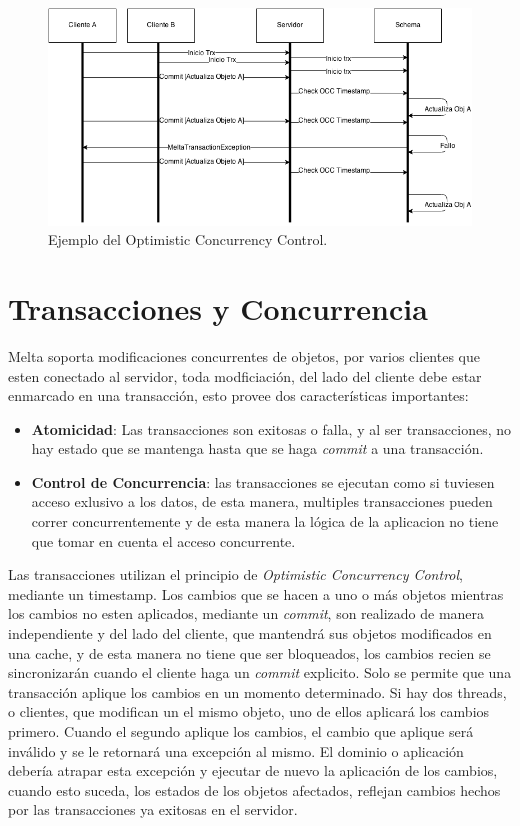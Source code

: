\documentclass{melta}
\begin{document}
\begin{figure}
\centering
\includegraphics[scale=0.5]{Transaccion}
\caption{Ejemplo del Optimistic Concurrency Control.}
\label{melta:occ}
\end{figure}

\newpage
\section{Transacciones y Concurrencia}
\label{sec:tran}
Melta soporta modificaciones concurrentes de objetos, por varios clientes que esten conectado al servidor, toda modficiación, del lado del cliente debe estar enmarcado en una transacción, esto provee dos características importantes:

\begin{itemize}
\item \textbf{Atomicidad}: Las transacciones son exitosas o falla, y al ser transacciones, no hay estado que se mantenga hasta que se haga \textit{commit} a una transacción.
\item \textbf{Control de Concurrencia}: las transacciones se ejecutan como si tuviesen acceso exlusivo a los datos, de esta manera, multiples transacciones pueden correr concurrentemente y de esta manera la lógica de la aplicacion no tiene que tomar en cuenta el acceso concurrente.
\end{itemize}

Las transacciones utilizan el principio de \textit{Optimistic Concurrency Control}, mediante un timestamp. Los cambios que se hacen a uno o más objetos mientras los cambios no esten aplicados, mediante un \textit{commit}, son realizado de manera independiente y del lado del cliente, que mantendrá sus objetos modificados en una cache, y de esta manera no tiene que ser bloqueados, los cambios recien se sincronizarán cuando el cliente haga un \textit{commit} explicito. Solo se permite que una transacción aplique los cambios en un momento determinado. Si hay dos threads, o clientes, que modifican un el mismo objeto, uno de ellos aplicará los cambios primero. Cuando el segundo aplique los cambios, el cambio que aplique será inválido y se le retornará una excepción al mismo. El dominio o aplicación debería atrapar esta excepción y ejecutar de nuevo la aplicación de los cambios, cuando esto suceda, los estados de los objetos afectados, reflejan cambios hechos por las transacciones ya exitosas en el servidor.
\end{document}
